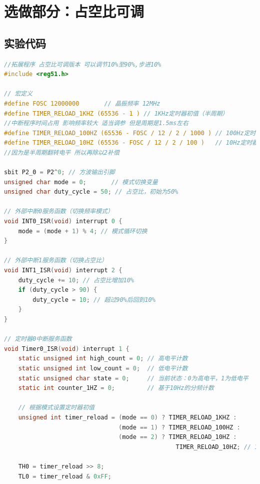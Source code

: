 \documentclass[12pt,hyperref,a4paper,UTF8]{ctexart}
\begin{document}
\section{选做部分：占空比可调}

\subsection{实验代码}

\begin{lstlisting}[language=C, caption={实验程序}]
//拓展程序 占空比可调版本 可以调节10%至90%,步进10%
#include <reg51.h>

// 宏定义
#define FOSC 12000000       // 晶振频率 12MHz
#define TIMER_RELOAD_1KHZ (65536 - 1 ) // 1KHz定时器初值（半周期） 
//中断程序时间占用 影响频率较大 适当调参 但是周期是1.5ms左右
#define TIMER_RELOAD_100HZ (65536 - FOSC / 12 / 2 / 1000 ) // 100Hz定时器初值
#define TIMER_RELOAD_10HZ (65536 - FOSC / 12 / 2 / 100 )   // 10Hz定时器初值
//因为是半周期翻转电平 所以再除以2补偿

sbit P2_0 = P2^0; // 方波输出引脚
unsigned char mode = 0;       // 模式切换变量
unsigned char duty_cycle = 50; // 占空比，初始为50%

// 外部中断0服务函数（切换频率模式）
void INT0_ISR(void) interrupt 0 {
    mode = (mode + 1) % 4; // 模式循环切换
}

// 外部中断1服务函数（切换占空比）
void INT1_ISR(void) interrupt 2 {
    duty_cycle += 10; // 占空比增加10%
    if (duty_cycle > 90) {
        duty_cycle = 10; // 超过90%后回到10%
    }
}

// 定时器0中断服务函数
void Timer0_ISR(void) interrupt 1 {
    static unsigned int high_count = 0; // 高电平计数
    static unsigned int low_count = 0;  // 低电平计数
    static unsigned char state = 0;     // 当前状态：0为高电平，1为低电平
    static int counter_1HZ = 0;         // 基于10Hz的分频计数

    // 根据模式设置定时器初值
    unsigned int timer_reload = (mode == 0) ? TIMER_RELOAD_1KHZ :
                                (mode == 1) ? TIMER_RELOAD_100HZ :
                                (mode == 2) ? TIMER_RELOAD_10HZ :
                                                TIMER_RELOAD_10HZ; // 1Hz基于10Hz分频

    TH0 = timer_reload >> 8;
    TL0 = timer_reload & 0xFF;


\end{lstlisting}
\end{document}
